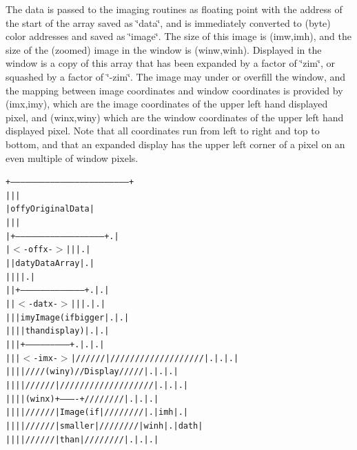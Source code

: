 The data is passed to the imaging routines as floating point with the address of the start of the array saved as \char`\"{}data\char`\"{}, and is immediately converted to (byte) color addresses and saved as \char`\"{}image\char`\"{}. The size of this image is (imw,imh), and the size of the (zoomed) image in the window is (winw,winh). Displayed in the window is a copy of this array that has been expanded by a factor of \char`\"{}zim\char`\"{}, or squashed by a factor of \char`\"{}-zim\char`\"{}. The image may under or overfill the window, and the mapping between image coordinates and window coordinates is provided by (imx,imy), which are the image coordinates of the upper left hand displayed pixel, and (winx,winy) which are the window coordinates of the upper left hand displayed pixel. Note that all coordinates run from left to right and top to bottom, and that an expanded display has the upper left corner of a pixel on an even multiple of window pixels. \small\begin{alltt}
    +------------------------------------------------------------------------+
    |        |                                                               |
    |      offy              Original Data                                   |
    |        |                                                               |
    |        +-----------------------------------------------------+ .       |
    |$<$-offx-$>$|        |                                            | .       |
    |        |      daty           Data Array                      | .       |
    |        |        |                                            | .       |
    |        |        +---------------------------------------+ .  | .       |
    |        |$<$-datx-$>$|       |                               | .  | .       |
    |        |        |      imy        Image (if bigger      | .  | .       |
    |        |        |       |                than display)  | .  | .       |
    |        |        |       +--------------------------+ .  | .  | .       |
    |        |        |$<$-imx-$>$|//////|///////////////////| .  | .  | .       |
    |        |        |       |////(winy)// Display /////| .  | .  | .       |
    |        |        |       |//////|///////////////////| .  | .  | .       |
    |        |        |       |(winx)+----------+////////| .  | .  | .       |
    |        |        |       |//////|Image (if |////////| .  |imh | .       |
    |        |        |       |//////| smaller  |////////|winh| .  |dath     |
    |        |        |       |//////|  than    |////////| .  | .  | .       |

\end{alltt}
